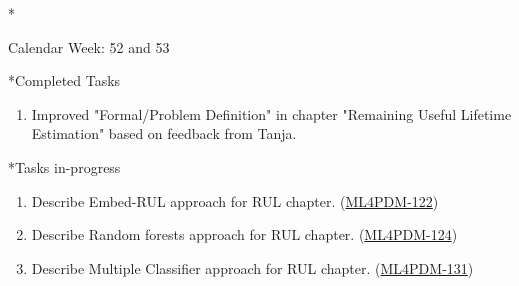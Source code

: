 \documentclass[11pt,a4paper]{article}
\begin{document}
\newpage
\begin{section}*{Calendar Week: 52 and 53 \hfill \date{1 January, 2021}}
 \begin{refsection}

   \begin{subsection}*{Completed Tasks}
     \begin{enumerate}
       \item
             Improved "Formal/Problem Definition" in chapter "Remaining Useful Lifetime Estimation" based on feedback from Tanja.
     \end{enumerate}
   \end{subsection}

   \begin{subsection}*{Tasks in-progress}
     \begin{enumerate}
       \item
             Describe Embed-RUL approach \cite{DBLP:journals/corr/abs-1709-01073} for RUL chapter. (\href{https://ml4pdm.atlassian.net/browse/ML4PDM-122}{ML4PDM-122})
       \item
             Describe Random forests approach \cite{GSCH:jennings2016forecasting, GSCH:cutler2012random} for RUL chapter. (\href{https://ml4pdm.atlassian.net/browse/ML4PDM-124}{ML4PDM-124})
       \item
             Describe Multiple Classifier approach \cite{DBLP:journals/tii/SustoSPMB15} for RUL chapter. (\href{https://ml4pdm.atlassian.net/browse/ML4PDM-131}{ML4PDM-131})
     \end{enumerate}
   \end{subsection}

   \printbibliography
 \end{refsection}
\end{section}
\end{document}
